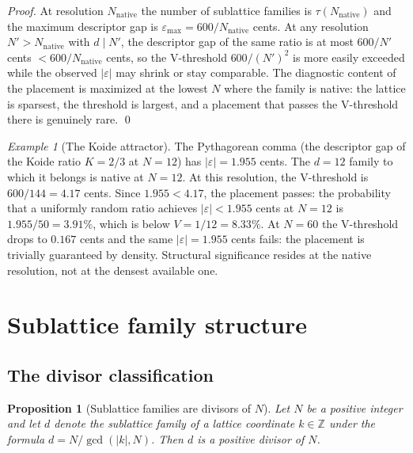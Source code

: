 \documentclass[11pt,a4paper]{article}
\newtheorem{proposition}[theorem]{Proposition}
\theoremstyle{definition}
\theoremstyle{remark}
\newtheorem{example}[theorem]{Example}
\newcommand{\Z}{\mathbb{Z}}
\begin{document}
\begin{proof}
At resolution $N_{\mathrm{native}}$ the number of sublattice families is $\tau(N_{\mathrm{native}})$ and the maximum descriptor gap is $\varepsilon_{\max} = 600/N_{\mathrm{native}}$ cents. At any resolution $N' > N_{\mathrm{native}}$ with $d \mid N'$, the descriptor gap of the same ratio is at most $600/N'$ cents $< 600/N_{\mathrm{native}}$ cents, so the V-threshold $600/(N')^{2}$ is more easily exceeded while the observed $|\varepsilon|$ may shrink or stay comparable. The diagnostic content of the placement is maximized at the lowest $N$ where the family is native: the lattice is sparsest, the threshold is largest, and a placement that passes the V-threshold there is genuinely rare. \qed
\end{proof}

\begin{example}[The Koide attractor]\label{ex:koide-v-threshold}
The Pythagorean comma (the descriptor gap of the Koide ratio $K=2/3$ at $N=12$) has $|\varepsilon| = 1.955$ cents. The $d=12$ family to which it belongs is native at $N=12$. At this resolution, the V-threshold is $600/144 = 4.17$ cents. Since $1.955 < 4.17$, the placement passes: the probability that a uniformly random ratio achieves $|\varepsilon| < 1.955$ cents at $N=12$ is $1.955/50 = 3.91\%$, which is below $V = 1/12 = 8.33\%$. At $N=60$ the V-threshold drops to $0.167$ cents and the same $|\varepsilon| = 1.955$ cents fails: the placement is trivially guaranteed by density. Structural significance resides at the native resolution, not at the densest available one.
\end{example}

\section{Sublattice family structure}\label{sec:sublattice}

\subsection{The divisor classification}

\begin{proposition}[Sublattice families are divisors of $N$]\label{prop:divisors}
Let $N$ be a positive integer and let $d$ denote the sublattice family of a lattice coordinate $k\in\Z$ under the formula $d=N/\gcd(|k|,N)$. Then $d$ is a positive divisor of $N$.
\end{proposition}
\end{document}
